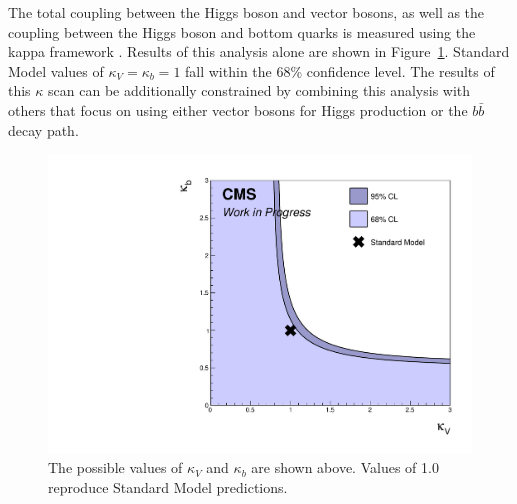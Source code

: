 The total coupling between the Higgs boson and vector bosons, as well as the coupling between
the Higgs boson and bottom quarks is measured using the kappa framework \cite{de_Blas_2020}.
Results of this analysis alone are shown in Figure~\ref{fig:kappa}.
Standard Model values of $\kappa_V = \kappa_b = 1$ fall within the 68\% confidence level.
The results of this $\kappa$ scan can be additionally constrained by combining
this analysis with others that focus on using either vector bosons for Higgs production
or the $b\bar{b}$ decay path.
%
\begin{figure}
  \centering
  \includegraphics[width=0.7\linewidth]{figures/limit.pdf}
  \caption[Measured values of $\kappa_V$ and $\kappa_b$]{
    The possible values of $\kappa_V$ and $\kappa_b$ are shown above.
    Values of 1.0 reproduce Standard Model predictions.
  }
  \label{fig:kappa}
\end{figure}
%

